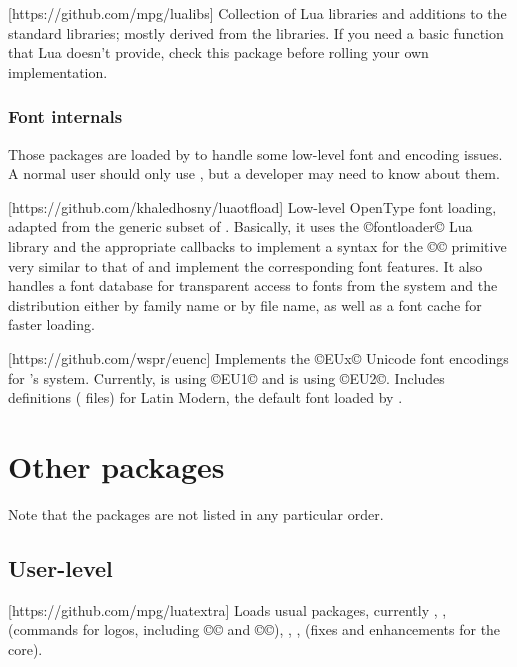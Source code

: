 \documentclass{lltxdoc}
\begin{document}
[https://github.com/mpg/lualibs]
Collection of Lua libraries and additions to the standard libraries; mostly
derived from the \context libraries. If you need a basic function that Lua
doesn't provide, check this package before rolling your own implementation.

\subsubsection{Font internals}\label{fontint}

Those packages are loaded by  to handle some low-level font and
encoding issues. A normal user should only use , but a developer
may need to know about them.

[https://github.com/khaledhosny/luaotfload]
Low-level OpenType font loading, adapted from the generic subset of \context.
Basically, it uses the ©fontloader© Lua library and the appropriate callbacks
to implement a syntax for the ©\font© primitive very similar to that of \xetex
and implement the corresponding font features. It also handles a font database
for transparent access to fonts from the system and the \tex distribution
either by family name or by file name, as well as a font cache for faster
loading.

[https://github.com/wspr/euenc]
Implements the ©EUx© Unicode font encodings for \latex's  system.
Currently, \xelatex is using ©EU1© and \luatex is using ©EU2©. Includes
definitions ( files) for Latin Modern, the default font loaded by
.


\section{Other packages}\label{other}

Note that the packages are not listed in any particular order.

\subsection{User-level}

[https://github.com/mpg/luatextra]
Loads usual packages, currently , , 
(commands for logos, including ©\LuaTeX© and ©\LuaLaTeX©), ,
,  (fixes and enhancements for the \latex core).
\end{document}
